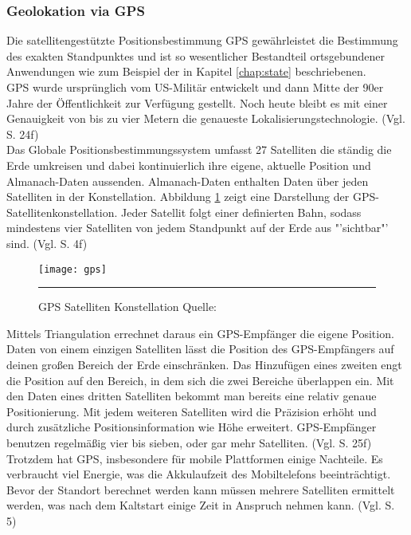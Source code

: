 \subsubsection{Geolokation via \gls{GPS}}
Die satellitengestützte Positionsbestimmung \gls{GPS} gewährleistet die Bestimmung des exakten Standpunktes und ist so wesentlicher Bestandteil ortsgebundener Anwendungen wie zum Beispiel der in Kapitel \ref{chap:state} beschriebenen. \\
\gls{GPS} wurde ursprünglich vom US-Militär entwickelt und dann Mitte der 90er Jahre der Öffentlichkeit zur Verfügung gestellt. Noch heute bleibt es mit einer Genauigkeit von bis zu vier Metern die genaueste Lokalisierungstechnologie. (Vgl. \cite{gps} S. 24f)\\
Das Globale Positionsbestimmungssystem umfasst 27 Satelliten die ständig die Erde umkreisen und dabei kontinuierlich ihre eigene, aktuelle Position und Almanach-Daten aussenden. Almanach-Daten enthalten Daten über jeden Satelliten in der Konstellation. Abbildung \ref{fig:gps} zeigt eine Darstellung der GPS-Satellitenkonstellation. Jeder Satellit folgt einer definierten Bahn, sodass mindestens vier Satelliten von jedem Standpunkt auf der Erde aus "'sichtbar"' sind. (Vgl. \cite{location} S. 4f)
\begin{figure}[H]  
    \centering  
    \texttt{[image: gps]} 
    \rule{35em}{0.5pt}
    \caption[GPS Satelliten Konstellation]{GPS Satelliten Konstellation  Quelle: \cite{fig:gps}}
    \label{fig:gps}
\end{figure}
Mittels Triangulation errechnet daraus ein \gls{GPS}-Empfänger die eigene Position. Daten von einem einzigen Satelliten lässt die Position des \gls{GPS}-Empfängers auf deinen großen Bereich der Erde einschränken. Das Hinzufügen eines zweiten engt die Position auf den Bereich, in dem sich die zwei Bereiche überlappen ein. Mit den Daten eines dritten Satelliten bekommt man bereits eine relativ genaue Positionierung. Mit jedem weiteren Satelliten wird die Präzision erhöht und durch zusätzliche Positionsinformation wie Höhe erweitert. \gls{GPS}-Empfänger benutzen regelmäßig vier bis sieben, oder gar mehr Satelliten. (Vgl. \cite{gps} S. 25f)\\
Trotzdem hat \gls{GPS}, insbesondere für mobile Plattformen einige Nachteile. Es verbraucht viel Energie, was die Akkulaufzeit des Mobiltelefons beeinträchtigt. Bevor der Standort berechnet werden kann müssen mehrere Satelliten ermittelt werden, was nach dem Kaltstart einige Zeit in Anspruch nehmen kann. (Vgl. \cite{location} S. 5)
